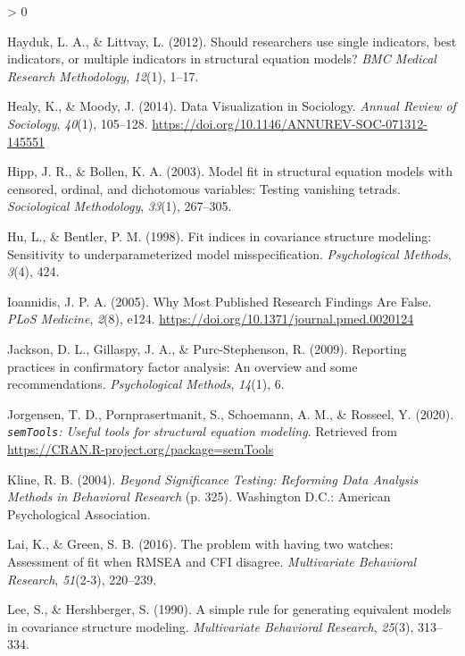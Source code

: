\documentclass[
  english,
  man]{apa6}
\newlength{\cslhangindent}
\newenvironment{CSLReferences}[2] %
 {%
  \setlength{\parindent}{0pt}
  \ifodd #1 \everypar{\setlength{\hangindent}{\cslhangindent}}\ignorespaces\fi
  \ifnum #2 > 0
  \setlength{\parskip}{#2\baselineskip}
  \fi
 }%
 {}
\begin{document}
\begin{CSLReferences}{1}{0}
\leavevmode\hypertarget{ref-hayduk2012should}{}%
Hayduk, L. A., \& Littvay, L. (2012). Should researchers use single indicators, best indicators, or multiple indicators in structural equation models? \emph{BMC Medical Research Methodology}, \emph{12}(1), 1--17.

\leavevmode\hypertarget{ref-Healy2014a}{}%
Healy, K., \& Moody, J. (2014). {Data Visualization in Sociology}. \emph{Annual Review of Sociology}, \emph{40}(1), 105--128. \url{https://doi.org/10.1146/ANNUREV-SOC-071312-145551}

\leavevmode\hypertarget{ref-hipp2003model}{}%
Hipp, J. R., \& Bollen, K. A. (2003). Model fit in structural equation models with censored, ordinal, and dichotomous variables: Testing vanishing tetrads. \emph{Sociological Methodology}, \emph{33}(1), 267--305.

\leavevmode\hypertarget{ref-hu1998fit}{}%
Hu, L., \& Bentler, P. M. (1998). Fit indices in covariance structure modeling: Sensitivity to underparameterized model misspecification. \emph{Psychological Methods}, \emph{3}(4), 424.

\leavevmode\hypertarget{ref-Ioannidis2005}{}%
Ioannidis, J. P. A. (2005). {Why Most Published Research Findings Are False}. \emph{PLoS Medicine}, \emph{2}(8), e124. \url{https://doi.org/10.1371/journal.pmed.0020124}

\leavevmode\hypertarget{ref-jackson2009reporting}{}%
Jackson, D. L., Gillaspy, J. A., \& Purc-Stephenson, R. (2009). Reporting practices in confirmatory factor analysis: An overview and some recommendations. \emph{Psychological Methods}, \emph{14}(1), 6.

\leavevmode\hypertarget{ref-semtools}{}%
Jorgensen, T. D., Pornprasertmanit, S., Schoemann, A. M., \& Rosseel, Y. (2020). \emph{\texttt{semTools}: {U}seful tools for structural equation modeling}. Retrieved from \url{https://CRAN.R-project.org/package=semTools}

\leavevmode\hypertarget{ref-Kline2004}{}%
Kline, R. B. (2004). \emph{{Beyond Significance Testing: Reforming Data Analysis Methods in Behavioral Research}} (p. 325). Washington D.C.: American Psychological Association.

\leavevmode\hypertarget{ref-lai2016problem}{}%
Lai, K., \& Green, S. B. (2016). The problem with having two watches: Assessment of fit when {RMSEA} and {CFI} disagree. \emph{Multivariate Behavioral Research}, \emph{51}(2-3), 220--239.

\leavevmode\hypertarget{ref-Lee90}{}%
Lee, S., \& Hershberger, S. (1990). A simple rule for generating equivalent models in covariance structure modeling. \emph{Multivariate Behavioral Research}, \emph{25}(3), 313--334.


\end{CSLReferences}
\end{document}
